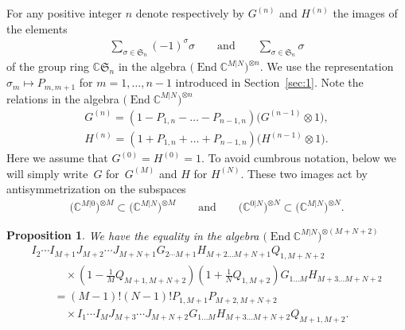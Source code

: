 \documentclass[pdftex]{sigma}
\numberwithin{equation}{section}
\newtheorem{Proposition}[Theorem]{Proposition}
\def\CC{{\mathbb{C}}}
\def\CMN{\CC^{M|N}}
\def\End{\operatorname{End}}
\def\ot{\otimes}
\def\si{\sigma}
\def\Sym{\mathfrak{S}}
\begin{document}
For any positive integer $n$ denote respectively by
$G^{(n)}$ and $H^{(n)}$ the images of the elements
\begin{gather*}
\sum_{\si\in\Sym_n}(-1)^\si \si
\qquad\text{and}\qquad
\sum_{\si\in\Sym_n}\si
\end{gather*}
of the group ring $\CC \Sym_n$
in the algebra
$\big(\End\CMN\big)^{\ot n} $.
We use the representation $\si_m\mapsto P_{m,m+1}$
for $m=1,\dots, n-1$ introduced in Section~\ref{sec:1}.
Note the relations in the algebra
$\big(\End\CMN\big)^{\ot n}$
\begin{gather}\label{GG}
G^{(n)} =(1-P_{1,n}-\dots-P_{n-1,n}) \big(G^{(n-1)}\ot1\big) ,\\
\label{HH}
H^{(n)} =(1+P_{1,n}+\dots+P_{n-1,n}) \big(H^{(n-1)}\ot1\big) .
\end{gather}
Here we assume that $G^{(0)}=H^{(0)}=1 $.
To avoid cumbrous notation, below we will simply write~$G$ for~$G^{(M)}$ and $H$ for $H^{(N)} $.
These two images act by antisymmetrization on the subspaces
\begin{gather}\label{SS}
\big(\CC^{M| 0}\big)^{\ot M}\subset\big(\CMN\big)^{\ot M}
\qquad\text{and}\qquad
\big(\CC^{0 |N}\big)^{\ot N}\subset\big(\CMN\big)^{\ot N} .
\end{gather}

\begin{Proposition}\label{L1}
We have the equality in the algebra
$\big(\End\CMN\big)^{\ot (M+N+2)}$
\begin{gather*}
 I_{2} \cdots I_{M+1}
J_{M+2} \cdots J_{M+N+1}
G_{2 \cdots M+1} H_{M+2 \dots M+N+1}
Q_{1,M+N+2}\\
\qquad\quad {} \times \left( 1-\frac1M Q_{M+1,M+N+2} \right)
\left( 1+\frac1N Q_{1,M+2} \right)
G_{1 \dots M} H_{M+3 \dots M+N+2} \\
\qquad {}=
(M-1) ! (N-1) !P_{1,M+1} P_{M+2,M+N+2}\\
\qquad\quad{} \times
I_{1} \cdots I_{M}
J_{M+3} \cdots J_{M+N+2}
G_{1 \dots M} H_{M+3 \dots M+N+2}
Q_{M+1,M+2} .
\end{gather*}
\end{Proposition}
\end{document}
